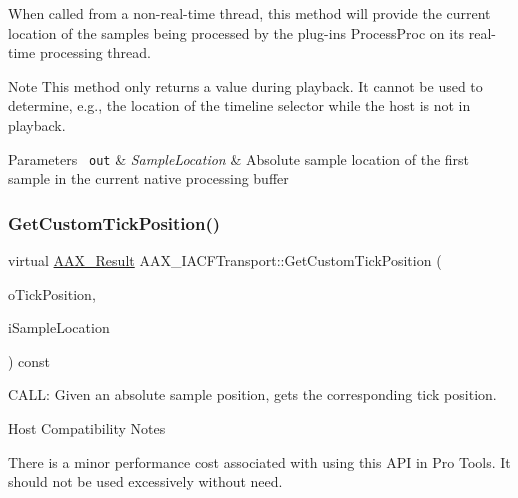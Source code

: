 When called from a non-\/real-\/time thread, this method will provide the current location of the samples being processed by the plug-\/in\textquotesingle{}s Process\+Proc on its real-\/time processing thread.

\begin{DoxyNote}{Note}
This method only returns a value during playback. It cannot be used to determine, e.\+g., the location of the timeline selector while the host is not in playback.
\end{DoxyNote}

\begin{DoxyParams}[1]{Parameters}
\mbox{\texttt{ out}}  & {\em Sample\+Location} & Absolute sample location of the first sample in the current native processing buffer \\
\hline
\end{DoxyParams}
\mbox{\label{a01757_ac4fb339830e4868adbd40910b5b72dc8}} 
\subsubsection{\texorpdfstring{GetCustomTickPosition()}{GetCustomTickPosition()}}
{\footnotesize\ttfamily virtual \mbox{\hyperlink{a00392_a4d8f69a697df7f70c3a8e9b8ee130d2f}{A\+A\+X\+\_\+\+Result}} A\+A\+X\+\_\+\+I\+A\+C\+F\+Transport\+::\+Get\+Custom\+Tick\+Position (\begin{DoxyParamCaption}\item[{int64\+\_\+t $\ast$}]{o\+Tick\+Position,  }\item[{int64\+\_\+t}]{i\+Sample\+Location }\end{DoxyParamCaption}) const\hspace{0.3cm}{\ttfamily [pure virtual]}}



C\+A\+LL\+: Given an absolute sample position, gets the corresponding tick position. 

\begin{DoxyRefDesc}{Host Compatibility Notes}
\item[\mbox{\hyperlink{a00786__compatibility_notes000062}{Host Compatibility Notes}}]There is a minor performance cost associated with using this A\+PI in Pro Tools. It should not be used excessively without need.\end{DoxyRefDesc}



